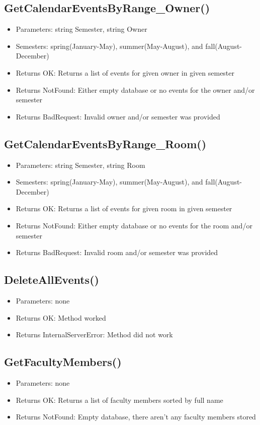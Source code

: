 \subsection{GetCalendarEventsByRange\_Owner()}
\begin{itemize}
\item{Parameters}: string Semester, string Owner
\item{Semesters}: spring(January-May), summer(May-August), and fall(August-December)
\item{Returns OK}: Returns a list of events for given owner in given semester
\item{Returns NotFound}: Either empty database or no events for the owner and/or semester
\item{Returns BadRequest}: Invalid owner and/or semester was provided
\end{itemize}

\subsection{GetCalendarEventsByRange\_Room()}
\begin{itemize}
\item{Parameters}: string Semester, string Room
\item{Semesters}: spring(January-May), summer(May-August), and fall(August-December)
\item{Returns OK}: Returns a list of events for given room in given semester
\item{Returns NotFound}: Either empty database or no events for the room and/or semester
\item{Returns BadRequest}: Invalid room and/or semester was provided
\end{itemize} 

\subsection{DeleteAllEvents()}
\begin{itemize}
\item{Parameters}: none
\item{Returns OK}: Method worked
\item{Returns InternalServerError}: Method did not work
\end{itemize}

\subsection{GetFacultyMembers()}
\begin{itemize}
\item{Parameters}: none
\item{Returns OK}: Returns a list of faculty members sorted by full name
\item{Returns NotFound}: Empty database, there aren't any faculty members stored
\end{itemize}


